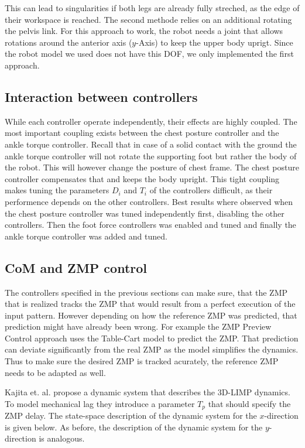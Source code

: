 \documentclass[english,ngerman]{KITreprt}
\newcommand{\clr}[2]{{\color{#1}{#2}}}
\newcommand{\todo}[1]{\marginpar{\clr{red}{#1}}}
\begin{document}
This can lead to singularities if both legs are already fully streched,
as the edge of their workspace is reached. The second methode relies on
an additional rotating the pelvis link. For this approach to work, the
robot needs a joint that allows rotations around the anterior axis
($y$-Axis) to keep the upper body uprigt. Since the robot model we used
does not have this DOF, we only implemented the first approach.

\subsection{Interaction between
controllers}\label{interaction-between-controllers}

While each controller operate independently, their effects are highly
coupled. The most important coupling exists between the chest posture
controller and the ankle torque controller. Recall that in case of a
solid contact with the ground the ankle torque controller will not
rotate the supporting foot but rather the body of the robot. This will
however change the posture of chest frame. The chest posture controller
compensates that and keeps the body upright.
\todo{relationship between foot force controller and other controllers}
This tight coupling makes tuning the parameters $D_i$ and $T_i$ of the
controllers difficult, as their performence depends on the other
controllers. Best results where observed when the chest posture
controller was tuned independently first, disabling the other
controllers. Then the foot force controllers was enabled and tuned and
finally the ankle torque controller was added and tuned.

\subsection{CoM and ZMP control}\label{com-and-zmp-control}

The controllers specified in the previous sections can make sure, that
the ZMP that is realized tracks the ZMP that would result from a perfect
execution of the input pattern. However depending on how the reference
ZMP was predicted, that prediction might have already been wrong. For
example the ZMP Preview Control approach uses the Table-Cart model to
predict the ZMP. That prediction can deviate significantly from the real
ZMP as the model simplifies the dynamics. Thus to make sure the desired
ZMP is tracked acurately, the reference ZMP needs to be adapted as well.

Kajita et. al. propose a dynamic system that describes the 3D-LIMP
dynamics. To model mechanical lag they introduce a parameter $T_p$ that
should specify the ZMP delay. The state-space description of the dynamic
system for the $x$-direction is given below. As before, the description
of the dynamic system for the $y$-direction is analogous.
\end{document}
